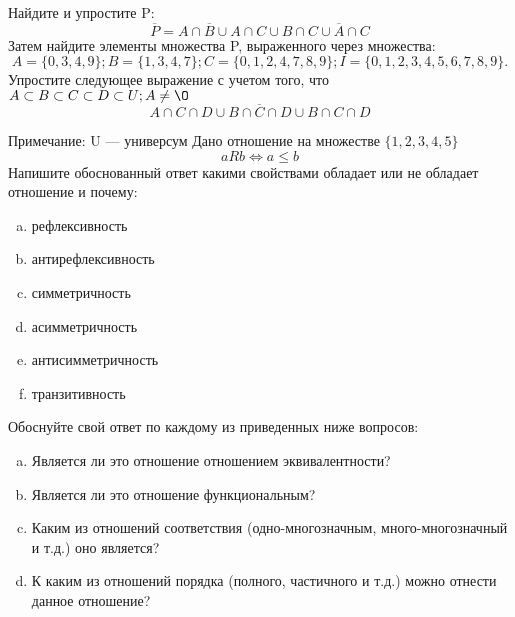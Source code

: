 \documentclass[10pt]{exam}
\begin{document}
\begin{questions}
\question
Найдите и упростите P:
\begin{equation*}
\overline{P} = A \cap \overline{B} \cup A \cap C \cup B \cap C \cup \overline{A} \cap C
\end{equation*}
Затем найдите элементы множества P, выраженного через множества:
\begin{equation*}
A = \{0, 3, 4, 9\}; 
B = \{1, 3, 4, 7\};
C = \{0, 1, 2, 4, 7, 8, 9\};
I = \{0, 1, 2, 3, 4, 5, 6, 7, 8, 9\}.
\end{equation*}\question
Упростите следующее выражение с учетом того, что $A\subset B \subset C \subset D \subset U; A \neq \O$
\begin{equation*}
A \cap C  \cap D \cup B \cap \overline{C} \cap D \cup B \cap C \cap D
\end{equation*}

Примечание: U — универсум\question
Дано отношение на множестве $\{1, 2, 3, 4, 5\}$ 
\begin{equation*}
aRb \iff a \leq b
\end{equation*}
Напишите обоснованный ответ какими свойствами обладает или не обладает отношение и почему:   
\begin{enumerate} [a)]\setcounter{enumi}{0}
\item рефлексивность
\item антирефлексивность
\item симметричность
\item асимметричность
\item антисимметричность
\item транзитивность
\end{enumerate}

Обоснуйте свой ответ по каждому из приведенных ниже вопросов:
\begin{enumerate} [a)]\setcounter{enumi}{0}
    \item Является ли это отношение отношением эквивалентности?
    \item Является ли это отношение функциональным?
    \item Каким из отношений соответствия (одно-многозначным, много-многозначный и т.д.) оно является?
    \item К каким из отношений порядка (полного, частичного и т.д.) можно отнести данное отношение?
\end{enumerate}



\end{questions}
\end{document}

